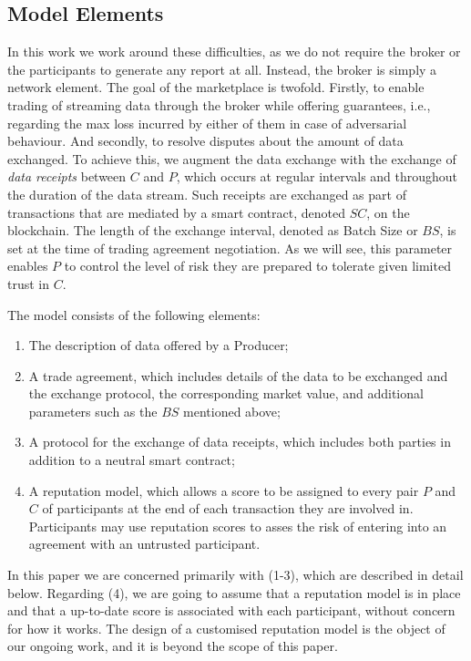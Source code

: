 \documentclass[letterpaper, 10 pt, conference]{ieeeconf}  %
\newcommand{\bs}{\ensuremath{\mathit{BS}}}
\newcommand{\smartc}{\ensuremath{\mathit{SC}}}
\begin{document}
\subsection{Model Elements}

In this work we work around these difficulties, as we do not require the broker or the participants to generate any report at all. 
Instead, the broker is simply a network element. The goal of the marketplace is twofold. 
Firstly, to enable trading of streaming data through the broker while offering guarantees, i.e., regarding the max  loss incurred by either of them in case of adversarial behaviour. And secondly, to resolve disputes about the amount of data exchanged.
%
To achieve this, we augment the data exchange with the exchange of \textit{data receipts} between $C$ and $P$, which occurs at regular intervals and throughout the duration of the data stream. Such receipts are exchanged as part of transactions that are mediated by a smart contract, denoted \smartc, on the blockchain. 
The length of the exchange interval, denoted as Batch Size or \bs, is set at the time of trading agreement negotiation. 
As we will see, this parameter enables  $P$ to control the level of risk they are prepared to tolerate given limited trust in $C$.

The model consists of the following elements:
\begin{enumerate}
	
	\item The description of data offered by a Producer;
	
	\item A trade agreement, which includes details of the data to be exchanged and the exchange protocol, the corresponding market value, and additional parameters such as the \bs{} mentioned above;
	
	\item A protocol for the exchange of data receipts, which includes both parties in addition to a neutral smart contract;
	
	\item A reputation model, which allows a score to be assigned to every pair $P$ and $C$ of participants at the end of each transaction they are involved in. 
	Participants may use reputation scores to asses the risk of entering into an agreement with an untrusted participant.

\end{enumerate}

In this paper we are concerned primarily with (1-3), which are described in detail below. Regarding (4), we are going to assume that a reputation model is in place and that a up-to-date score is associated with each participant, without concern for how it works. The design of a customised reputation model is the object of our ongoing work, and it is beyond the scope of this paper.
\end{document}
